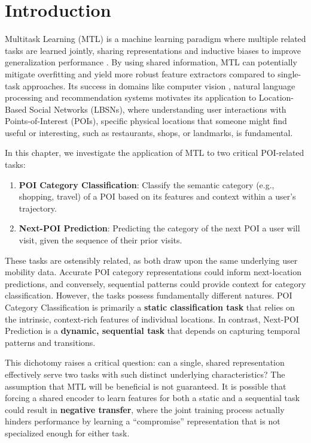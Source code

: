 \section{Introduction}
\label{sec:cbic:intro}

Multitask Learning (MTL) is a machine learning paradigm where multiple related tasks are learned jointly, sharing representations and inductive biases to improve generalization performance \cite{caruana1997multitask}. By using shared information, MTL can potentially mitigate overfitting and yield more robust feature extractors compared to single-task approaches. Its success in domains like computer vision \cite{kokkinos2016ubernet}, natural language processing \cite{wei2022finetuned} and recommendation systems \cite{Zhang2020} motivates its application to Location-Based Social Networks (LBSNs), where understanding user interactions with Points-of-Interest (POIs), specific physical locations that someone might find useful or interesting, such as restaurants, shops, or landmarks, is fundamental.

In this chapter, we investigate the application of MTL to two critical POI-related tasks:
\begin{enumerate}
    \item \textbf{POI Category Classification}: Classify the semantic category (e.g., shopping, travel) of a POI based on its features and context within a user's trajectory.
    \item \textbf{Next-POI Prediction}: Predicting the category of the next POI a user will visit, given the sequence of their prior visits.
\end{enumerate}

These tasks are ostensibly related, as both draw upon the same underlying user mobility data. Accurate POI category representations could inform next-location predictions, and conversely, sequential patterns could provide context for category classification. However, the tasks possess fundamentally different natures. POI Category Classification is primarily a \textbf{static classification task} that relies on the intrinsic, context-rich features of individual locations. In contrast, Next-POI Prediction is a \textbf{dynamic, sequential task} that depends on capturing temporal patterns and transitions.

This dichotomy raises a critical question: can a single, shared representation effectively serve two tasks with such distinct underlying characteristics? The assumption that MTL will be beneficial is not guaranteed. It is possible that forcing a shared encoder to learn features for both a static and a sequential task could result in \textbf{negative transfer}, where the joint training process actually hinders performance by learning a ``compromise'' representation that is not specialized enough for either task.

